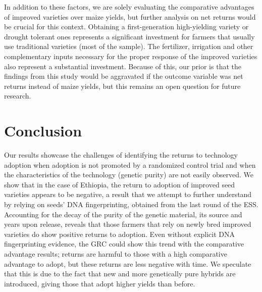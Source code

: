 \documentclass[11pt]{article}
\begin{document}
In addition to these factors, we are solely evaluating the comparative advantages of improved varieties over maize yields, but further analysis on net returns would be crucial for this context. Obtaining a first-generation high-yielding variety or drought tolerant ones represents a significant investment for farmers that usually use traditional varieties (most of the sample). The fertilizer, irrigation and other complementary inputs necessary for the proper response of the improved varieties also represent a substantial investment. Because of this, our prior is that the findings from this study would be aggravated if the outcome variable was net returns instead of maize yields, but this remains an open question for future research.

\section{Conclusion}\label{sec:conclusion}


Our results showcase the challenges of identifying the returns to technology adoption when adoption is not promoted by a randomized control trial and when the characteristics of the technology (genetic purity) are not easily observed. We show that in the case of Ethiopia, the return to adoption of improved seed varieties appears to be negative, a result that we attempt to further understand by relying on seeds' DNA fingerprinting, obtained from the last round of the ESS. Accounting for the decay of the purity of the genetic material, its source and years upon release, reveals that those farmers that rely on newly bred improved varieties do show positive returns to adoption. Even without explicit DNA fingerprinting evidence, the GRC could show this trend with the comparative advantage results; returns are harmful to those with a high comparative advantage to adopt, but these returns are less negative with time. We speculate that this is due to the fact that new and more genetically pure hybrids are introduced, giving those that adopt higher yields than before.
\end{document}
